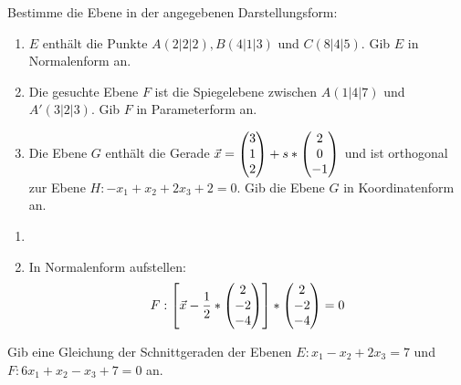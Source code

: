 






Bestimme die Ebene in der angegebenen Darstellungsform:
\begin{enumerate}
	\item $E$ enthält die Punkte $A(2|2|2), B(4|1|3)$ und $C(8|4|5)$. Gib $E$ in Normalenform an. %
	\item Die gesuchte Ebene $F$ ist die Spiegelebene zwischen $A(1|4|7)$ und $A'(3|2|3)$. Gib $F$ in Parameterform an. %
	\item Die Ebene $G$ enthält die Gerade $\vec x = \begin{pmatrix} 3\\1\\2 \end{pmatrix}+s*\begin{pmatrix} 2\\0\\-1 \end{pmatrix}$ und ist orthogonal zur Ebene $H:-x_1+x_2+2x_3+2=0$. Gib die Ebene $G$ in Koordinatenform an. %
\end{enumerate}
\begin{lsg}{}
	\begin{enumerate}
		\item
		\item In Normalenform aufstellen:
		\begin{equation*}
			F: \left[\vec x - \frac 12 *\begin{pmatrix} 2\\-2\\-4 \end{pmatrix}\right]*\begin{pmatrix} 2\\-2\\-4 \end{pmatrix}=0
		\end{equation*}
	\end{enumerate}
\end{lsg}

Gib eine Gleichung der Schnittgeraden der Ebenen $E: x_1-x_2+2x_3=7$ und $F:6x_1+x_2-x_3+7=0$ an.
\begin{lsg}{}

\end{lsg}


